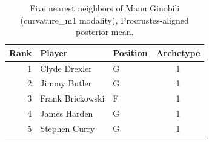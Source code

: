 \begin{table}[htbp]
  \centering\small
  \begin{tabular}{rllc}
    \toprule
    Rank & Player & Position & Archetype \\
    \midrule
    1 & Clyde Drexler & G & 1 \\
    2 & Jimmy Butler & G & 1 \\
    3 & Frank Brickowski & F & 1 \\
    4 & James Harden & G & 1 \\
    5 & Stephen Curry & G & 1 \\
    \bottomrule
  \end{tabular}
  \caption{Five nearest neighbors of Manu Ginobili (curvature_m1 modality), Procrustes-aligned posterior mean.}
  \label{tab:Manu_Ginobili_neighbors_curvature_m1}
\end{table}

